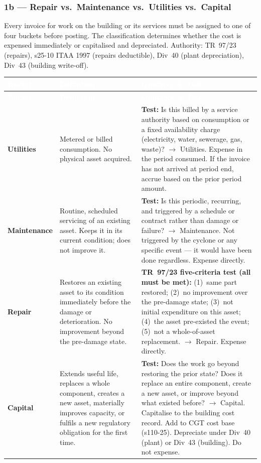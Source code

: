 \documentclass[10pt,a4paper]{article}
\begin{document}
\subsubsection{1b --- Repair vs.\ Maintenance vs.\ Utilities vs.\ Capital}
\label{sec:capex}

Every invoice for work on the building or its services must be assigned to one of four buckets before posting. The classification determines whether the cost is expensed immediately or capitalised and depreciated. Authority: TR~97/23 (repairs), s25-10 ITAA 1997 (repairs deductible), Div~40 (plant depreciation), Div~43 (building write-off).

{\small\sffamily
\begin{longtable}{@{} L{2.2cm} L{3.2cm} L{7.3cm} @{}}
\textcolor{white}{\bfseries Bucket} & \textcolor{white}{\bfseries Definition} & \textcolor{white}{\bfseries Guidance \& Test} \\
\midrule
\endfirsthead
{}\textcolor{white}{\bfseries Bucket} & \textcolor{white}{\bfseries Definition} & \textcolor{white}{\bfseries Guidance \& Test} \\
\midrule
\endhead
\textbf{Utilities} & Metered or billed consumption. No physical asset acquired. & \textbf{Test:} Is this billed by a service authority based on consumption or a fixed availability charge (electricity, water, sewerage, gas, waste)? $\to$ Utilities. Expense in the period consumed. If the invoice has not arrived at period end, accrue based on the prior period amount. \\
\textbf{Maintenance} & Routine, scheduled servicing of an existing asset. Keeps it in its current condition; does not improve it. & \textbf{Test:} Is this periodic, recurring, and triggered by a schedule or contract rather than damage or failure? $\to$ Maintenance. Not triggered by the cyclone or any specific event --- it would have been done regardless. Expense directly. \\
\textbf{Repair} & Restores an existing asset to its condition immediately before the damage or deterioration. No improvement beyond the pre-damage state. & \textbf{TR~97/23 five-criteria test (all must be met):} (1)~same part restored; (2)~no improvement over the pre-damage state; (3)~not initial expenditure on this asset; (4)~the asset pre-existed the event; (5)~not a whole-of-asset replacement. $\to$ Repair. Expense directly. \\
\textbf{Capital} & Extends useful life, replaces a whole component, creates a new asset, materially improves capacity, or fulfils a new regulatory obligation for the first time. & \textbf{Test:} Does the work go beyond restoring the prior state? Does it replace an entire component, create a new asset, or improve beyond what existed before? $\to$ Capital. Capitalise to the building cost record. Add to CGT cost base (s110-25). Depreciate under Div~40 (plant) or Div~43 (building). Do not expense. \\
\bottomrule
\end{longtable}}
\end{document}
